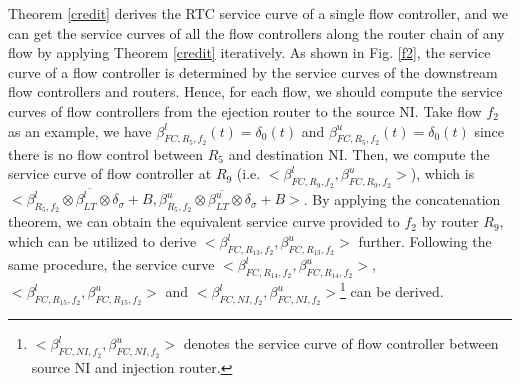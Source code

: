 \documentclass[preprint]{elsarticle}
\begin{document}
Theorem \ref{credit} derives the RTC service curve of a single flow controller, and we can get the service curves of all the flow controllers along the router chain of any flow by applying Theorem \ref{credit} iteratively. As shown in Fig. \ref{f2}, the service curve of a flow controller is determined by the service curves of the downstream flow controllers and routers. Hence, for each flow, we should compute the service curves of flow controllers from the ejection router to the source NI. Take flow $f_2$ as an example, we have $\beta_{FC,R_5,f_2}^l(t)=\delta_0(t)$ and $\beta_{FC,R_5,f_2}^u(t)=\delta_0(t)$ since there is no flow control between $R_5$ and destination NI. Then, we compute the service curve of flow controller at $R_{9}$ (i.e. $<\beta_{FC,R_9,f_2}^l,\beta_{FC,R_9,f_2}^u>$), which is $<\overline{\beta_{R_5,f_2}^l\otimes\beta_{LT}^l\otimes\delta_\sigma+B},\overline{\beta_{R_5,f_2}^u\otimes\beta_{LT}^u\otimes\delta_\sigma+B}>$. By applying the concatenation theorem, we can obtain the equivalent service curve provided to $f_2$ by router $R_{9}$, which can be utilized to derive $<\beta_{FC,R_{13},f_2}^l,\beta_{FC,R_{13},f_2}^u>$ further. Following the same procedure, the service curve $<\beta_{FC,R_{14},f_2}^l,\beta_{FC,R_{14},f_2}^u>$, $<\beta_{FC,R_{15},f_2}^l,\beta_{FC,R_{15},f_2}^u>$ and $<\beta_{FC,NI,f_2}^l,\beta_{FC,NI,f_2}^u>$\footnote{$<\beta_{FC,NI,f_2}^l,\beta_{FC,NI,f_2}^u>$ denotes the service curve of flow controller between source NI and injection router.} can be derived.
\end{document}
